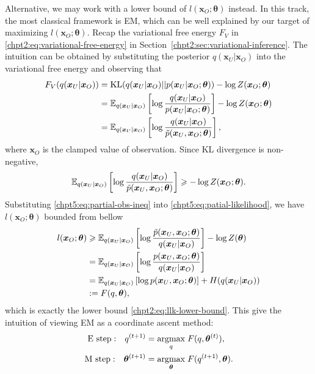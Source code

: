 Alternative, we may work with a lower bound of $l(\bm{x}_O; \bm{\theta})$ instead. In this track, the most classical framework is EM, which can be well explained by our target of maximizing $l(\bm{x}_O; \bm{\theta})$. Recap the variational free energy $F_V$ in \eqref{chpt2:eq:variational-free-energy} in Section~\ref{chpt2:sec:variational-inference}. The intuition can be obtained by substituting the posterior $q(\bm{x}_U|\bm{x}_O)$ into the variational free energy and observing that
\begin{align}
  F_V(q(\bm{x}_U|\bm{x}_O)) & = \mathrm{KL}(q(\bm{x}_U|\bm{x}_O) || p(\bm{x}_U|\bm{x}_O; \bm{\theta})) - \log{Z(\bm{x}_O; \bm{\theta})} \nonumber \\
                            &= \mathbb{E}_{q(\bm{x}_U|\bm{x}_O)}\left[  \log{\frac{q(\bm{x}_U|\bm{x}_O)}{{p}(\bm{x}_U| \bm{x}_O; \bm{\theta})}} \right] - \log{Z(\bm{x}_O;\bm{\theta})} \nonumber \\
                            &= \mathbb{E}_{q(\bm{x}_U|\bm{x}_O)}\left[ \log{\frac{q(\bm{x}_U|\bm{x}_O)}{\tilde{p}(\bm{x}_U, \bm{x}_O; \bm{\theta})}} \right],
\end{align}
where $\bm{x}_O$ is the clamped value of observation. Since KL divergence is non-negative,
\begin{equation}\label{chpt5:eq:partial-obs-ineq}
  \mathbb{E}_{q(\bm{x}_U|\bm{x}_O)}\left[ \log{\frac{q(\bm{x}_U|\bm{x}_O)}{\tilde{p}(\bm{x}_U, \bm{x}_O; \bm{\theta})}} \right] \geqslant - \log{Z(\bm{x}_O; \bm{\theta})}.
\end{equation}
Substituting \eqref{chpt5:eq:partial-obs-ineq} into \eqref{chpt5:eq:patial-likelihood}, we have $l(\bm{x}_O; \bm{\theta})$ bounded from bellow
\begin{align}\label{chpt5:eq:lower-bound-F}
  l(\bm{x}_O; \bm{\theta}) &\geqslant \mathbb{E}_{q(\bm{x}_U|\bm{x}_O)}\left[ \log{\frac{\tilde{p}(\bm{x}_U, \bm{x}_O; \bm{\theta})}{q(\bm{x}_U|\bm{x}_O)}} \right] - \log{Z(\bm{\theta})} \nonumber \\
                           & = \mathbb{E}_{q(\bm{x}_U|\bm{x}_O)}\left[ \log{\frac{{p}(\bm{x}_U, \bm{x}_O; \bm{\theta})}{q(\bm{x}_U|\bm{x}_O)}} \right] \nonumber \\
                           & = \mathbb{E}_{q(\bm{x}_U|\bm{x}_O)}\left[ \log{{p}(\bm{x}_U, \bm{x}_O; \bm{\theta})} \right] + H({q(\bm{x}_U|\bm{x}_O)}) \nonumber \\
                           & := F(q, \bm{\theta}),
\end{align}
which is exactly the lower bound \eqref{chpt2:eq:llk-lower-bound}. This give the intuition of viewing EM as a coordinate ascent method:
\begin{align}
  \mathrm{E~step:}~~~ q^{(t+1)} &= \underset{q}{\operatorname{argmax}}\;{F(q, \bm{\theta}^{(t)})}, \\
  \mathrm{M~step:}~~~\bm{\theta}^{(t+1)} &= \underset{\bm{\theta}}{\operatorname{argmax}}\;{F(q^{(t+1)}, \bm{\theta})}.
\end{align}

